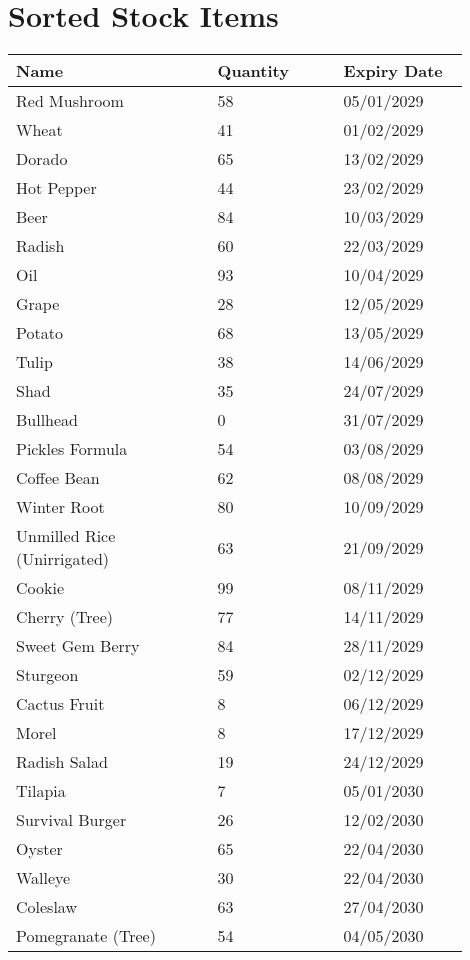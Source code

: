 \documentclass{article}
\begin{document}
\section*{Sorted Stock Items}
\begin{longtable}{|p{0.4\linewidth}|p{0.25\linewidth}|p{0.25\linewidth}|}\hline
\textbf{Name} & \textbf{Quantity} & \textbf{Expiry Date}\\
\hline
Red Mushroom & 58 & 05/01/2029 \\
\hline
Wheat & 41 & 01/02/2029 \\
\hline
Dorado & 65 & 13/02/2029 \\
\hline
Hot Pepper & 44 & 23/02/2029 \\
\hline
Beer & 84 & 10/03/2029 \\
\hline
Radish & 60 & 22/03/2029 \\
\hline
Oil & 93 & 10/04/2029 \\
\hline
Grape & 28 & 12/05/2029 \\
\hline
Potato & 68 & 13/05/2029 \\
\hline
Tulip & 38 & 14/06/2029 \\
\hline
Shad & 35 & 24/07/2029 \\
\hline
Bullhead & 0 & 31/07/2029 \\
\hline
Pickles Formula & 54 & 03/08/2029 \\
\hline
Coffee Bean & 62 & 08/08/2029 \\
\hline
Winter Root & 80 & 10/09/2029 \\
\hline
Unmilled Rice (Unirrigated) & 63 & 21/09/2029 \\
\hline
Cookie & 99 & 08/11/2029 \\
\hline
Cherry (Tree) & 77 & 14/11/2029 \\
\hline
Sweet Gem Berry & 84 & 28/11/2029 \\
\hline
Sturgeon & 59 & 02/12/2029 \\
\hline
Cactus Fruit & 8 & 06/12/2029 \\
\hline
Morel & 8 & 17/12/2029 \\
\hline
Radish Salad & 19 & 24/12/2029 \\
\hline
Tilapia & 7 & 05/01/2030 \\
\hline
Survival Burger & 26 & 12/02/2030 \\
\hline
Oyster & 65 & 22/04/2030 \\
\hline
Walleye & 30 & 22/04/2030 \\
\hline
Coleslaw & 63 & 27/04/2030 \\
\hline
Pomegranate (Tree) & 54 & 04/05/2030 \\

\end{longtable}
\end{document}
